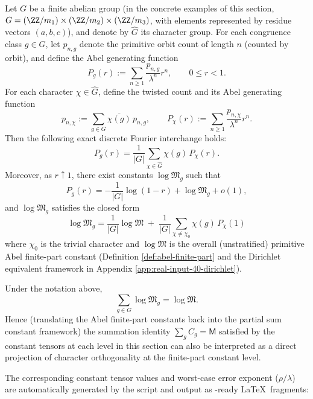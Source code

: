 \begin{remark}\label{prop:arity-chebotarev-mertens-fourier}
Let $G$ be a finite abelian group (in the concrete examples of this section, $G=(\ZZ/m_1)\times(\ZZ/m_2)\times(\ZZ/m_3)$, with elements represented by residue vectors $(a,b,c)$), and denote by $\widehat G$ its character group. For each congruence class $g\in G$, let $p_{n,g}$ denote the primitive orbit count of length $n$ (counted by orbit), and define the Abel generating function
$$
P_g(r):=\sum_{n\ge 1}\frac{p_{n,g}}{\lambda^n}r^n,\qquad 0\le r<1.
$$
For each character $\chi\in\widehat G$, define the twisted count and its Abel generating function
$$
p_{n,\chi}:=\sum_{g\in G}\overline{\chi(g)}\,p_{n,g},
\qquad
P_\chi(r):=\sum_{n\ge 1}\frac{p_{n,\chi}}{\lambda^n}r^n.
$$
Then the following exact discrete Fourier interchange holds:
$$
P_g(r)=\frac{1}{|G|}\sum_{\chi\in\widehat G}\chi(g)\,P_\chi(r).
$$
Moreover, as $r\uparrow 1$, there exist constants $\log\mathfrak{M}_g$ such that
$$
P_g(r)=-\frac{1}{|G|}\log(1-r)+\log\mathfrak{M}_g+o(1),
$$
and $\log\mathfrak{M}_g$ satisfies the closed form
$$
\boxed{\
\log\mathfrak{M}_g
=\frac{1}{|G|}\log\mathfrak{M}
\;+\;\frac{1}{|G|}\sum_{\chi\neq \chi_0}\chi(g)\,P_\chi(1)\
}
$$
where $\chi_0$ is the trivial character and $\log\mathfrak{M}$ is the overall (unstratified) primitive Abel finite-part constant (Definition \ref{def:abel-finite-part} and the Dirichlet equivalent framework in Appendix \ref{app:real-input-40-dirichlet}).
\end{remark}

\begin{remark}\label{cor:arity-chebotarev-mertens-sum}
Under the notation above,
$$
\sum_{g\in G}\log\mathfrak{M}_g=\log\mathfrak{M}.
$$
Hence (translating the Abel finite-part constants back into the partial sum constant framework) the summation identity
$
\sum_g C_g=\mathsf{M}
$
satisfied by the constant tensors at each level in this section can also be interpreted as a direct projection of character orthogonality at the finite-part constant level.
\end{remark}
The corresponding constant tensor values and worst-case error exponent ($\rho/\lambda$) are automatically generated by the script
and output as \verb||-ready \LaTeX\ fragments:



